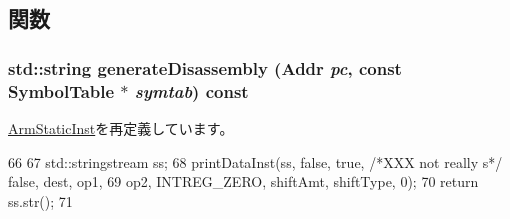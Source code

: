 \subsection{関数}
\hypertarget{classArmISA_1_1DataXSRegOp_a95d323a22a5f07e14d6b4c9385a91896}{
\subsubsection[{generateDisassembly}]{\setlength{\rightskip}{0pt plus 5cm}std::string generateDisassembly ({\bf Addr} {\em pc}, \/  const SymbolTable $\ast$ {\em symtab}) const}}
\label{classArmISA_1_1DataXSRegOp_a95d323a22a5f07e14d6b4c9385a91896}


\hyperlink{classArmISA_1_1ArmStaticInst_a95d323a22a5f07e14d6b4c9385a91896}{ArmStaticInst}を再定義しています。


\begin{DoxyCode}
66 {
67     std::stringstream ss;
68     printDataInst(ss, false, true, /*XXX not really s*/ false, dest, op1,
69                   op2, INTREG_ZERO, shiftAmt, shiftType, 0);
70     return ss.str();
71 }
\end{DoxyCode}


